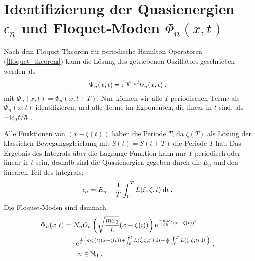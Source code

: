   \section{\texorpdfstring{Identifizierung der Quasienergien $\epsilon_n$ und Floquet-Moden $\Phi_n(x,t)$}{Identifizierung der Quasienergien epsilon_n und Floquet-Moden Phi_n(x,t)}}
    Nach dem Floquet-Theorem für periodische Hamilton-Operatoren (\ref{floquet_theorem}) kann die Lösung des getriebenen Oszillators geschrieben werden als
    \begin{equation}
      \Psi_n(x,t) = \text e^{\frac{-\text i}{\hbar}\epsilon_nt}\Phi_n(x,t) \; ,
    \end{equation}
    mit $\Phi_n(x,t)=\Phi_n(x,t+T)$.
    Nun können wir alle $T$-periodischen Terme als $\Phi_n(x,t)$ identifizieren, und alle Terme im Exponenten, die linear in $t$ sind, als $-\text i\epsilon_n t/\hbar$ \cite{haenggi}.

    Alle Funktionen von $(x-\zeta(t))$ haben die Periode $T$, da $\zeta(T)$ als Lösung der klassichen Bewegungsgleichung mit $S(t)=S(t+T)$ die Periode $T$ hat. Das
    Ergebnis des Integrals über die Lagrange-Funktion kann nur $T$-periodisch oder linear in $t$ sein, deshalb sind die Quasienergien gegeben durch die $E_n$ und den linearen Teil des Integrals:
    \begin{equation}
      \epsilon_n = E_n - \frac{1}{T} \int_0^T L(\dot \zeta, \zeta, t) \: \text d t \; .
    \end{equation}
    Die Floquet-Moden sind demnach
    \begin{align}
      \begin{split}
        \Phi_n(x,t) &=
         N_nO_n\left(\sqrt{\frac{m\omega_0}{\hbar}}(x-\zeta(t))\right) \text e^{\frac{-m\omega_0}{2\hbar}(x-\zeta(t))^2} \\
        &\quad \cdot \text e^{\frac{\text i}{\hbar}\left(m\dot \zeta(t)(x-\zeta(t))+\int_0^tL(\dot \zeta,\zeta,t')\:\text d t-\frac{t}{T} \int_0^T L(\dot \zeta,\zeta,t)\:\text dt\: \right)} \; , \\
        &\quad \quad n \in \mathbb{N}_0 \; .
        \label{floquet-moden_einzelner}
      \end{split}
    \end{align}


